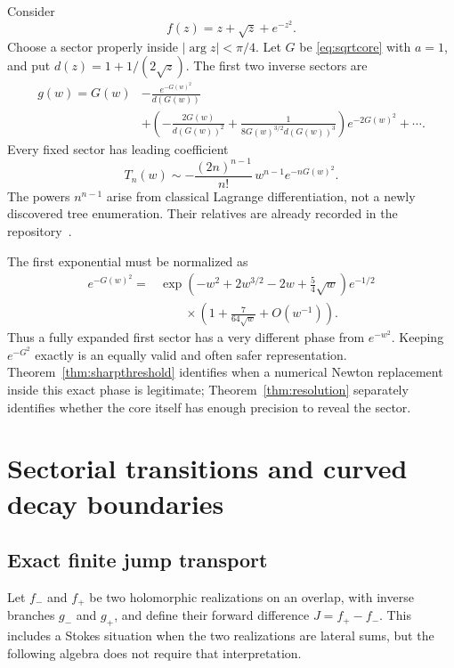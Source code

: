 \documentclass[11pt,a4paper]{article}
\theoremstyle{definition}
\theoremstyle{remark}
\numberwithin{equation}{section}
\begin{document}
Consider
\begin{equation}\label{eq:workedmodel}
 f(z)=z+\sqrt z+e^{-z^2}.
\end{equation}
Choose a sector properly inside $|\arg z|<\pi/4$. Let $G$ be \eqref{eq:sqrtcore} with $a=1$, and put $d(z)=1+1/(2\sqrt z)$. The first two inverse sectors are
\begin{align}
 g(w)=G(w)
 &-\frac{e^{-G(w)^2}}{d(G(w))}\nonumber\\
 &+\left(-\frac{2G(w)}{d(G(w))^2}
 +\frac1{8G(w)^{3/2}d(G(w))^3}\right)e^{-2G(w)^2}
 +\cdots.\label{eq:workedsectors}
\end{align}
Every fixed sector has leading coefficient
\begin{equation}\label{eq:workedleading}
 T_n(w)\sim-\frac{(2n)^{n-1}}{n!}\,w^{n-1}e^{-nG(w)^2}.
\end{equation}
The powers $n^{n-1}$ arise from classical Lagrange differentiation, not a newly discovered tree enumeration. Their relatives are already recorded in the repository~\cite{RepoSupport,RepoStokes}.

The first exponential must be normalized as
\begin{align*}
 e^{-G(w)^2}
 ={}&\exp\left(-w^2+2w^{3/2}-2w+\frac54\sqrt w\right)e^{-1/2}\\
 &\qquad\times\left(1+\frac7{64\sqrt w}+O(w^{-1})\right).
\end{align*}
Thus a fully expanded first sector has a very different phase from $e^{-w^2}$. Keeping $e^{-G^2}$ exactly is an equally valid and often safer representation. Theorem~\ref{thm:sharpthreshold} identifies when a numerical Newton replacement inside this exact phase is legitimate; Theorem~\ref{thm:resolution} separately identifies whether the core itself has enough precision to reveal the sector.

\section{Sectorial transitions and curved decay boundaries}\label{sec:stokes}

\subsection{Exact finite jump transport}

Let $f_-$ and $f_+$ be two holomorphic realizations on an overlap, with inverse branches $g_-$ and $g_+$, and define their forward difference $J=f_+-f_-$. This includes a Stokes situation when the two realizations are lateral sums, but the following algebra does not require that interpretation.
\end{document}
